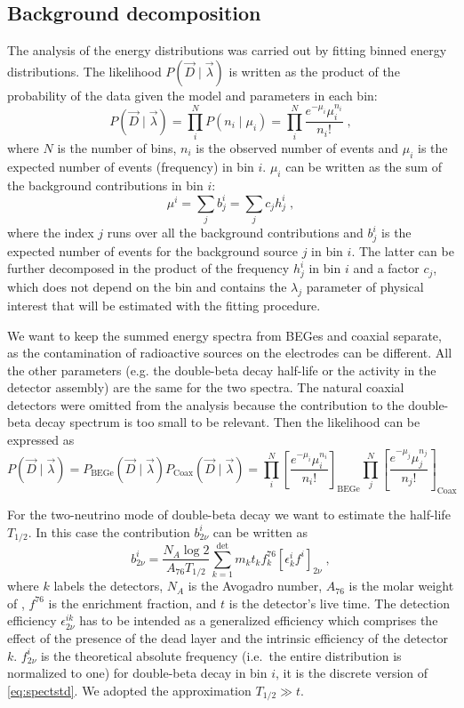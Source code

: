 \subsection{Background decomposition}
The analysis of the energy distributions was carried out by fitting binned energy distributions. The likelihood $P(\vec{D}\mid\vec{\lambda})$ is written as the product of the probability of the data given the model and parameters in each bin:
\[P(\vec{D}\mid\vec{\lambda})=\prod_i^{N}P(n_i\mid\mu_i)=\prod_i^N\frac{e^{-\mu_i}\mu_i^{n_i}}{n_i!}\;,\]
where $N$ is the number of bins, $n_i$ is the observed number of events and $\mu_i$ is the expected number of events (frequency) in bin $i$. $\mu_i$ can be written as the sum of the background contributions in bin $i$:
\[\mu^i=\sum_jb_j^i=\sum_j c_jh_j^i\;,\]
where the index $j$ runs over all the background contributions and $b_j^i$ is the expected number of events for the background source $j$ in bin $i$. The latter can be further decomposed in the product of the frequency $h_j^i$ in bin $i$ and a factor $c_j$, which does not depend on the bin and contains the $\lambda_j$ parameter of physical interest that will be estimated with the fitting procedure.

We want to keep the summed energy spectra from BEGes and coaxial separate, as the contamination of radioactive sources on the electrodes can be different. All the other parameters (e.g. the double-beta decay half-life or the  activity in the detector assembly) are the same for the two spectra. The natural coaxial detectors were omitted from the analysis because the contribution to the double-beta decay spectrum is too small to be relevant. Then the likelihood can be expressed as
\[P(\vec{D}\mid\vec{\lambda})=P_\text{BEGe}(\vec{D}\mid\vec{\lambda})P_\text{Coax}(\vec{D}\mid\vec{\lambda})=\prod_i^N\left[\frac{e^{-\mu_i}\mu_i^{n_i}}{n_i!}\right]_\text{BEGe}\prod_j^N\left[\frac{e^{-\mu_j}\mu_j^{n_j}}{n_j!}\right]_\text{Coax}\]

\marginnote{$2\nbb$} For the two-neutrino mode of double-beta decay we want to estimate the half-life $T_{1/2}$. In this case the contribution $b_{2\nu}^i$ can be written as
\[b_{2\nu}^i=\frac{N_A\log2}{A_{76}T_{1/2}}\sum_{k=1}^\text{det}m_kt_kf^{76}_k\left[\epsilon^i_kf^i\right]_{2\nu}\;,\]
where $k$ labels the detectors, $N_A$ is the Avogadro number, $A_{76}$ is the molar weight of , $f^{76}$ is the enrichment fraction, and $t$ is the detector's live time. The detection efficiency $\epsilon_{2\nu}^{ik}$ has to be intended as a generalized efficiency which comprises the effect of the presence of the dead layer and the intrinsic efficiency of the detector $k$. $f_{2\nu}^i$ is the theoretical absolute frequency (i.e.~the entire distribution is normalized to one) for double-beta decay in bin $i$, it is the discrete version of \ref{eq:spectstd}. We adopted the approximation $T_{1/2}\gg t$.

